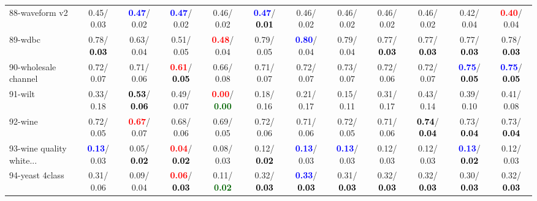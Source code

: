 \begin{table}[h]
\begin{center}
{\begin{tabular}{lc|c|c|c|c|c|c|c|c|c|c}
88-waveform v2 &   0.45/  0.03 & \textcolor{blue}{\textbf{  0.47}}/  0.02 & \textcolor{blue}{\textbf{  0.47}}/  0.02 &   0.46/  0.02 & \textcolor{blue}{\textbf{  0.47}}/\textcolor{black}{\textbf{  0.01}} &   0.46/  0.02 &   0.46/  0.02 &   0.46/  0.02 &   0.46/  0.02 &   0.42/  0.04 & \textcolor{red}{\textbf{  0.40}}/  0.04 \\
89-wdbc &   0.78/\textcolor{black}{\textbf{  0.03}} &   0.63/  0.04 &   0.51/  0.05 & \textcolor{red}{\textbf{  0.48}}/  0.04 &   0.79/  0.05 & \textcolor{blue}{\textbf{  0.80}}/  0.04 &   0.79/  0.04 &   0.77/\textcolor{black}{\textbf{  0.03}} &   0.77/\textcolor{black}{\textbf{  0.03}} &   0.77/\textcolor{black}{\textbf{  0.03}} &   0.78/\textcolor{black}{\textbf{  0.03}} \\
90-wholesale channel &   0.72/  0.07 &   0.71/  0.06 & \textcolor{red}{\textbf{  0.61}}/\textcolor{black}{\textbf{  0.05}} &   0.66/  0.08 &   0.71/  0.07 &   0.72/  0.07 &   0.73/  0.07 &   0.72/  0.06 &   0.72/  0.07 & \textcolor{blue}{\textbf{  0.75}}/\textcolor{black}{\textbf{  0.05}} & \textcolor{blue}{\textbf{  0.75}}/\textcolor{black}{\textbf{  0.05}} \\
91-wilt &   0.33/  0.18 & \textcolor{black}{\textbf{  0.53}}/\textcolor{black}{\textbf{  0.06}} &   0.49/  0.07 & \textcolor{red}{\textbf{  0.00}}/\textcolor{darkgreen}{\textbf{  0.00}} &   0.18/  0.16 &   0.21/  0.17 &   0.15/  0.11 &   0.31/  0.17 &   0.43/  0.14 &   0.39/  0.10 &   0.41/  0.08 \\
92-wine &   0.72/  0.05 & \textcolor{red}{\textbf{  0.67}}/  0.07 &   0.68/  0.06 &   0.69/  0.05 &   0.72/  0.06 &   0.71/  0.06 &   0.72/  0.05 &   0.71/  0.06 & \textcolor{black}{\textbf{  0.74}}/\textcolor{black}{\textbf{  0.04}} &   0.73/\textcolor{black}{\textbf{  0.04}} &   0.73/\textcolor{black}{\textbf{  0.04}} \\ \hline
93-wine quality white... & \textcolor{blue}{\textbf{  0.13}}/  0.03 &   0.05/\textcolor{black}{\textbf{  0.02}} & \textcolor{red}{\textbf{  0.04}}/\textcolor{black}{\textbf{  0.02}} &   0.08/  0.03 &   0.12/\textcolor{black}{\textbf{  0.02}} & \textcolor{blue}{\textbf{  0.13}}/  0.03 & \textcolor{blue}{\textbf{  0.13}}/  0.03 &   0.12/  0.03 &   0.12/  0.03 & \textcolor{blue}{\textbf{  0.13}}/\textcolor{black}{\textbf{  0.02}} &   0.12/  0.03 \\
94-yeast 4class &   0.31/  0.06 &   0.09/  0.04 & \textcolor{red}{\textbf{  0.06}}/\textcolor{black}{\textbf{  0.03}} &   0.11/\textcolor{darkgreen}{\textbf{  0.02}} &   0.32/\textcolor{black}{\textbf{  0.03}} & \textcolor{blue}{\textbf{  0.33}}/\textcolor{black}{\textbf{  0.03}} &   0.31/\textcolor{black}{\textbf{  0.03}} &   0.32/\textcolor{black}{\textbf{  0.03}} &   0.32/\textcolor{black}{\textbf{  0.03}} &   0.30/\textcolor{black}{\textbf{  0.03}} &   0.32/\textcolor{black}{\textbf{  0.03}} \\\end{tabular}
}\label{strats2bC4.5w}
\end{center}
\end{table}